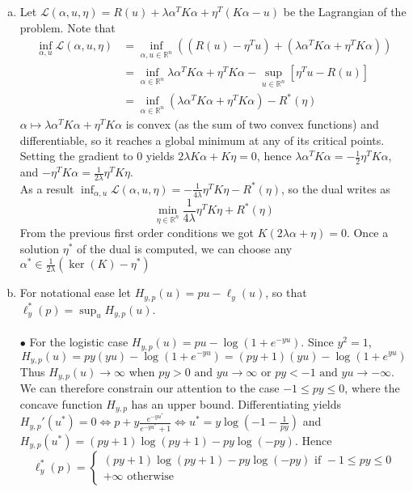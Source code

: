 \documentclass[a4paper,11pt, hidelinks]{article}
\begin{document}
\begin{enumerate}[a.]
  \item Let $\mathcal{L}(\alpha, u, \eta) = R(u) + \lambda \alpha^T K \alpha + \eta^T(K \alpha - u)$ be the Lagrangian of the problem. Note that
  $$\begin{aligned}
  \inf_{\alpha, u}\mathcal{L}(\alpha, u, \eta) &= \inf_{\alpha, u \in \mathbb{R}^n} \left((R(u)-\eta^T u) + (\lambda \alpha^T K \alpha + \eta^T K \alpha)\right)\\
  &= \inf_{\alpha\in \mathbb{R}^n}\lambda \alpha^T K \alpha + \eta^T K \alpha - \sup_{u\in \mathbb{R}^n}[\eta^T u - R(u)] \\
  &= \inf_{\alpha\in \mathbb{R}^n}\left(\lambda \alpha^T K \alpha + \eta^T K \alpha\right) - R^{*}(\eta)
  \end{aligned}$$
  $\alpha \mapsto \lambda \alpha^T K \alpha + \eta^T K \alpha$ is convex (as the sum of two convex functions) and differentiable, so it reaches a global minimum at any of its critical points. Setting the gradient to $0$ yields $2 \lambda K \alpha + K \eta =0$, hence $\lambda \alpha^T K  \alpha = -\frac{1}{2}\eta^T K \alpha  $, and $ -\eta^T K \alpha  = \frac{1}{2 \lambda} \eta^T K \eta $.\\
  As a result $\inf_{\alpha, u}\mathcal{L}(\alpha, u, \eta) = -\frac{1}{4 \lambda} \eta^T K \eta - R^{*}(\eta)$, so the dual writes as 
  $$\min_{\eta \in \mathbb{R}^n} \frac{1}{4 \lambda} \eta^T K \eta +  R^{*}(\eta)$$
  From the previous first order conditions we got $K(2 \lambda \alpha + \eta) = 0$. Once a solution $\eta^*$ of the dual  is computed, we can choose any $\alpha^* \in \frac{1}{2\lambda}\left(\ker(K) - \eta^* \right)$

  \item For notational ease let $ H_{y,p}(u) = pu - \ell_y(u) $, so that $\ell_y^{*}(p) = \sup_u H_{y,p}(u) $.\\
  \\
$\bullet$
For the logistic case $H_{y,p}(u) = pu - \log\left(1+e^{-yu}\right) $. Since $y^2=1$, $$H_{y,p}(u) = py(yu) - \log\left(1+e^{-yu}\right) = (py+1)(yu) - \log\left(1+e^{yu}\right) $$ Thus $H_{y,p}(u) \to \infty $ when $ py>0 \text{ and } yu \to \infty $ or $ py<-1 \text{ and } yu \to -\infty $. We can therefore constrain our attention to the case $-1 \leq py \leq 0$, where the concave function $ H_{y,p} $ has an upper bound. Differentiating yields $ H_{y,p}'(u^{*}) =  0 \iff p + y \frac{e^{-yu^{*}}}{e^{-yu^{*}}+1} \iff u^{*} = y \log\left( -1 - \frac{1}{py} \right) $ and $ H_{y,p}(u^*) = (py+1)\log(py+1) - py\log(-py) $. Hence
\begin{equation*}
 \ell_y^{*}(p)
=\left\{ 
\begin{array}{lr}
(py+1)\log(py+1) - py\log(-py) \text{ if } -1 \leq py \leq 0 \\ 
+\infty \text{ otherwise}
\end{array} 
\right.   
\end{equation*}


\end{enumerate}
\end{document}
